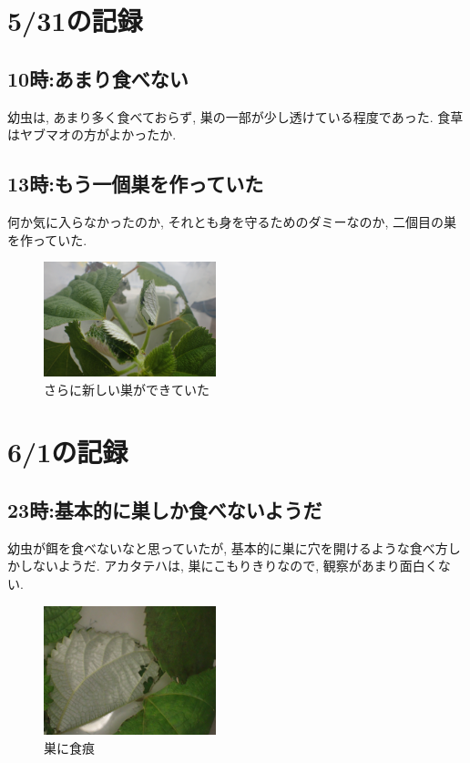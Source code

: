 \documentclass{jsarticle}
\begin{document}
\section{5/31の記録}
\subsection{10時:あまり食べない}
幼虫は, あまり多く食べておらず, 巣の一部が少し透けている程度であった. 食草はヤブマオの方がよかったか. 

\subsection{13時:もう一個巣を作っていた}
何か気に入らなかったのか, それとも身を守るためのダミーなのか, 二個目の巣を作っていた. 

\begin{figure}[htbp]
  \begin{center}
    \includegraphics[width=5cm]{photo2/Larva-nest.JPG}
  \end{center}
  \caption{さらに新しい巣ができていた}
\end{figure}

\section{6/1の記録}
\subsection{23時:基本的に巣しか食べないようだ}
幼虫が餌を食べないなと思っていたが, 基本的に巣に穴を開けるような食べ方しかしないようだ. 
アカタテハは, 巣にこもりきりなので, 観察があまり面白くない. 

\begin{figure}[htbp]
  \begin{center}
    \includegraphics[width=5cm]{photo3/bitemark.JPG}
  \end{center}
  \caption{巣に食痕}
\end{figure}
\end{document}
